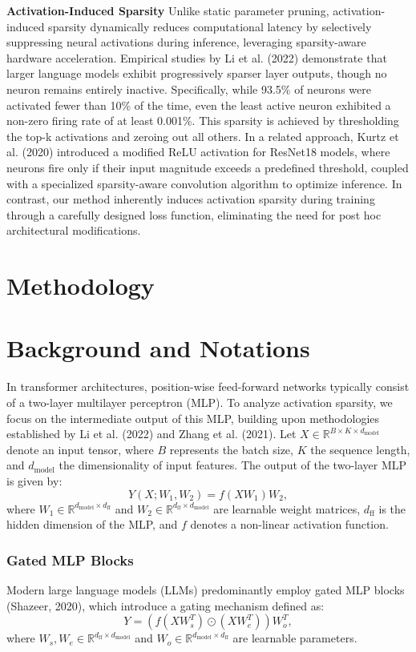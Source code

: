 \documentclass[conference]{IEEEtran}
\begin{document}
\textbf{Activation-Induced Sparsity} Unlike static parameter pruning, activation-induced sparsity dynamically reduces computational latency by selectively suppressing neural activations during inference, leveraging sparsity-aware hardware acceleration. Empirical studies by Li et al. (2022) demonstrate that larger language models exhibit progressively sparser layer outputs, though no neuron remains entirely inactive. Specifically, while 93.5\% of neurons were activated fewer than 10\% of the time, even the least active neuron exhibited a non-zero firing rate of at least 0.001\%. This sparsity is achieved by thresholding the top-k activations and zeroing out all others. In a related approach, Kurtz et al. (2020) introduced a modified ReLU activation for ResNet18 models, where neurons fire only if their input magnitude exceeds a predefined threshold, coupled with a specialized sparsity-aware convolution algorithm to optimize inference. In contrast, our method inherently induces activation sparsity during training through a carefully designed loss function, eliminating the need for post hoc architectural modifications.




\section{Methodology}




\section{Background and Notations}

In transformer architectures, position-wise feed-forward networks typically consist of a two-layer multilayer perceptron (MLP). To analyze activation sparsity, we focus on the intermediate output of this MLP, building upon methodologies established by Li et al. (2022) and Zhang et al. (2021). Let \(X \in \mathbb{R}^{B \times K \times d_{\text{model}}}\) denote an input tensor, where \(B\) represents the batch size, \(K\) the sequence length, and \(d_{\text{model}}\) the dimensionality of input features. The output of the two-layer MLP is given by: \[Y(X; W_1, W_2) = f(X W_1) W_2,\] where \(W_1 \in \mathbb{R}^{d_{\text{model}} \times d_{\text{ff}}}\) and \(W_2 \in \mathbb{R}^{d_{\text{ff}} \times d_{\text{model}}}\) are learnable weight matrices, \(d_{\text{ff}}\) is the hidden dimension of the MLP, and \(f\) denotes a non-linear activation function.
\subsubsection*{Gated MLP Blocks}
Modern large language models (LLMs) predominantly employ gated MLP blocks (Shazeer, 2020), which introduce a gating mechanism defined as: \[Y = \left( f(X W_s^T) \odot (X W_e^T) \right) W_o^T,\] where \(W_s, W_e \in \mathbb{R}^{d_{\text{ff}} \times d_{\text{model}}}\) and \(W_o \in \mathbb{R}^{d_{\text{model}} \times d_{\text{ff}}}\) are learnable parameters.
\end{document}
